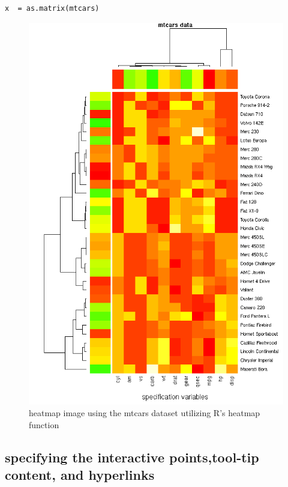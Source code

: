 \documentclass[]{article}
\begin{document}
\begin{verbatim}
x  = as.matrix(mtcars)
\end{verbatim}


\begin{center}
\begin{figure}
\includegraphics{exHeat}
\caption{heatmap image using the mtcars dataset utilizing R's heatmap function}
\end{figure}
\end{center}

\subsection{specifying the interactive points,tool-tip content, and hyperlinks}
\end{document}
